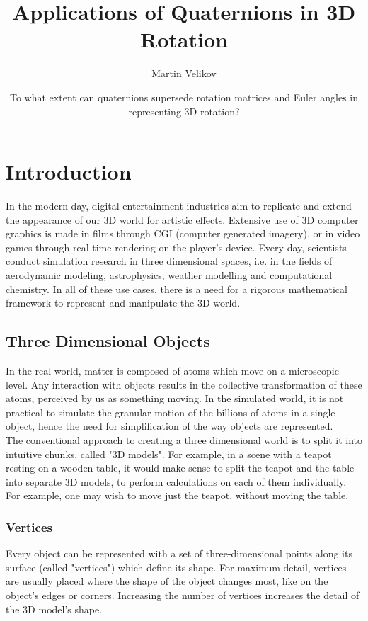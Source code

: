 \documentclass[12pt, a4paper]{article}
\title{\vspace{-3cm}Applications of Quaternions in 3D Rotation}
\author{Martin Velikov}
\date{To what extent can quaternions supersede rotation matrices and Euler
    angles in representing 3D rotation?}
\begin{document}
\maketitle
\tableofcontents

\pagebreak

\section{Introduction}
In the modern day, digital entertainment industries aim to replicate and extend
the appearance of our 3D world for artistic effects. Extensive use of 3D
computer graphics is made in films through CGI (computer generated imagery), or
in video games through real-time rendering on the player's device. Every day,
scientists conduct simulation research in three dimensional spaces, i.e. in the
fields of aerodynamic modeling, astrophysics, weather modelling and
computational chemistry. In all of these use cases, there is a need for a
rigorous mathematical framework to represent and manipulate the 3D world. \\

\subsection{Three Dimensional Objects}
In the real world, matter is composed of atoms which move on a microscopic
level. Any interaction with objects results in the collective transformation of
these atoms, perceived by us as something moving. In the simulated world, it is
not practical to simulate the granular motion of the billions of atoms in a
single object, hence the need for simplification of the way objects are
represented. \\

The conventional approach to creating a three dimensional world is to split it
into intuitive chunks, called "3D models". For example, in a scene with a teapot
resting on a wooden table, it would make sense to split the teapot and the table
into separate 3D models, to perform calculations on each of them individually.
For example, one may wish to move just the teapot, without moving the table. \\


\subsubsection{Vertices}
Every object can be represented with a set of three-dimensional points along its
surface (called "vertices") which define its shape. For maximum detail, vertices
are usually placed where the shape of the object changes most, like on the
object's edges or corners. Increasing the number of vertices increases the
detail of the 3D model's shape.
\end{document}
